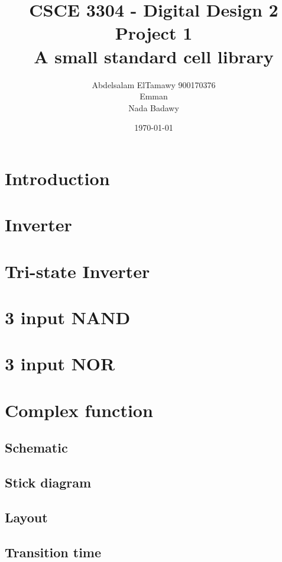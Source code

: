 \documentclass[]{article}
\author{Abdelsalam ElTamawy 900170376\\Emman\\Nada Badawy}
\date{\today}
\title{CSCE 3304 - Digital Design 2\\Project 1\\A small standard cell library\\}
\begin{document}
	
\begin{titlepage}
	\maketitle
\end{titlepage}

\tableofcontents

\pagebreak

\section{Introduction}

\section{Inverter}

\section{Tri-state Inverter}

\section{3 input NAND}

\section{3 input NOR}

\section{Complex function}

\subsection{Schematic}

\subsection{Stick diagram}

\subsection{Layout}

\subsection{Transition time}
\end{document}
